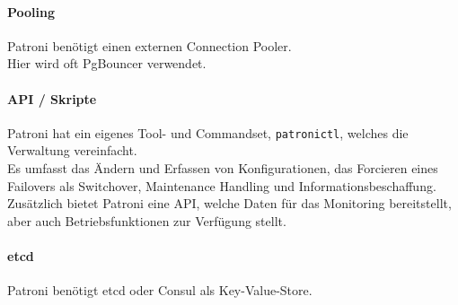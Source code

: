 \begin{flushleft}
    \paragraph{Pooling}
    Patroni benötigt einen externen \Gls{Connection Pooler}.\\
    Hier wird oft PgBouncer \cite{ATBELZ2X} verwendet.
\end{flushleft}
\begin{flushleft}
    \paragraph{API / Skripte}
    Patroni hat ein eigenes Tool- und Commandset, \texttt{patronictl}, welches die Verwaltung vereinfacht.\\
    Es umfasst das Ändern und Erfassen von Konfigurationen, das Forcieren eines Failovers als Switchover, Maintenance Handling und Informationsbeschaffung.\\
    Zusätzlich bietet Patroni eine API, welche Daten für das Monitoring bereitstellt,\\
    aber auch Betriebsfunktionen zur Verfügung stellt.\\
\end{flushleft}
\begin{flushleft}
    \paragraph{\gls{etcd}}
    Patroni benötigt etcd oder \Gls{Consul} als \Gls{Key-Value-Store}.
\end{flushleft}
